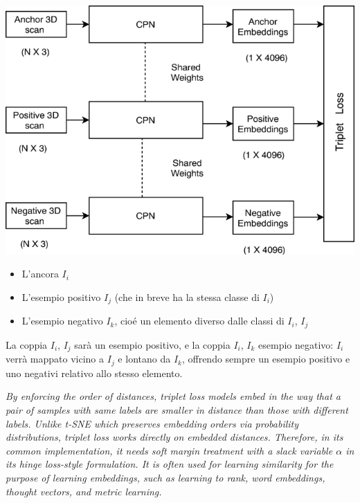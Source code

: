 \documentclass[11pt]{article}
\begin{document}
\begin{center}
    \begin{minipage}{0.48\linewidth}
    \includegraphics[width=\linewidth]{tripletNetwork.png}
    \end{minipage}
\end{center}

\begin{itemize}
    \item L'ancora $I_i$ 
    \item L'esempio positivo $I_j$ (che in breve ha la stessa classe di $I_i$)
    \item L'esempio negativo $I_k$, cioé un elemento diverso dalle classi di $I_i$, $I_j$
\end{itemize}

La coppia $I_i$, $I_j$ sarà un esempio positivo, e la coppia $I_i$, $I_k$ esempio negativo: $I_i$ verrà mappato vicino a $I_j$ e lontano da $I_k$, offrendo sempre un esempio positivo e uno negativi relativo allo stesso elemento.

\textit{
    By enforcing the order of distances, triplet loss models embed in the way that a pair of samples with same labels are smaller in distance than those with different labels. Unlike t-SNE which preserves embedding orders via probability distributions, triplet loss works directly on embedded distances. Therefore, in its common implementation, it needs soft margin treatment with a slack variable 
    $\alpha$  in its hinge loss-style formulation. It is often used for learning similarity for the purpose of learning embeddings, such as learning to rank, word embeddings, thought vectors, and metric learning.
}
\end{document}
